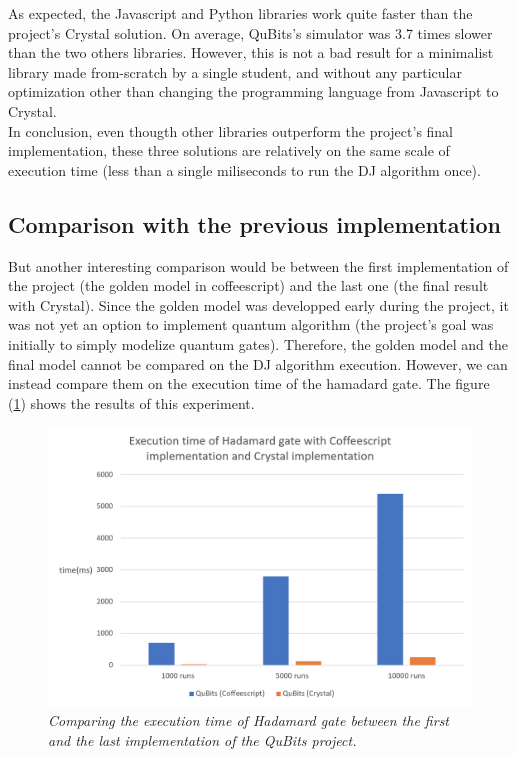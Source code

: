 \documentclass[a4paper,12pt]{report}
\newcommand{\para}[1]{\par{#1}\\}
\begin{document}
\para{
    As expected, the Javascript and Python libraries work quite faster than the project's Crystal solution. On average, QuBits's simulator was 3.7 times slower than the two others libraries. However, this is not a bad result for a minimalist library made from-scratch by a single student, and without any particular optimization other than changing the programming language from Javascript to Crystal. \\ In conclusion, even thougth other libraries outperform the project's final implementation, these three solutions are relatively on the same scale of execution time (less than a single miliseconds to run the DJ algorithm once).
}

        \subsection{Comparison with the previous implementation}

\para{
    But another interesting comparison would be between the first implementation of the project (the golden model in coffeescript) and the last one (the final result with Crystal). Since the golden model was developped early during the project, it was not yet an option to implement quantum algorithm (the project's goal was initially to simply modelize quantum gates). Therefore, the golden model and the final model cannot be compared on the DJ algorithm execution. However, we can instead compare them on the execution time of the hamadard gate. The figure (\ref{results2}) shows the results of this experiment.
}

\begin{figure}
	\begin{center}
		\includegraphics[scale=0.6]{images/results2}
	\end{center}
	\caption{\textit{Comparing the execution time of Hadamard gate between the first and the last implementation of the QuBits project.}}
	\label{results2}
\end{figure}
\end{document}
